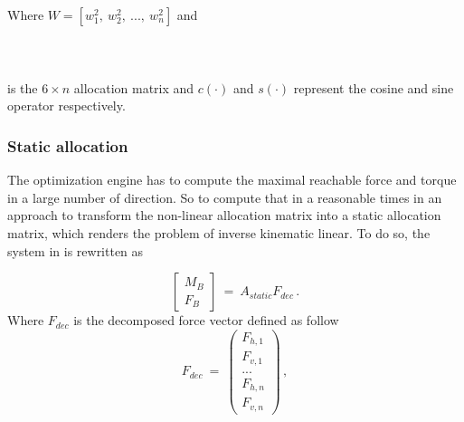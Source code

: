 Where $W = [w_1^2,\ w_2^2,\ ...,\ w_n^2]$ and\\\\
\\\\
is the $6 \times n$ allocation matrix and $c(\cdot)$ and $s(\cdot)$ represent the
cosine and sine operator respectively.

\subsubsection{Static allocation}
\label{sec:allocation}
The optimization engine has to compute the maximal reachable force and torque in
a large number of direction. So to compute that in a reasonable times in
\citep{kamel_voliro:_2018} an approach to transform the non-linear allocation matrix
into a static allocation matrix, which renders the problem of inverse kinematic
linear. To do so, the system in \Cref{force_eq} is rewritten as

\begin{equation}
  \label{static_force_eq}
    \begin{bmatrix}
      M_B \\
      F_B
    \end{bmatrix} \ = \
    A_{static}F_{dec}
    \, .
\end{equation}
Where $F_{dec}$ is the decomposed force vector defined as follow
\begin{equation}
  \label{f_dec}
    F_{dec} \ = \
    \begin{pmatrix}
      F_{h,1} \\
      F_{v,1} \\
      ... \\
      F_{h,n} \\
      F_{v,n}
    \end{pmatrix} \, ,
\end{equation}

